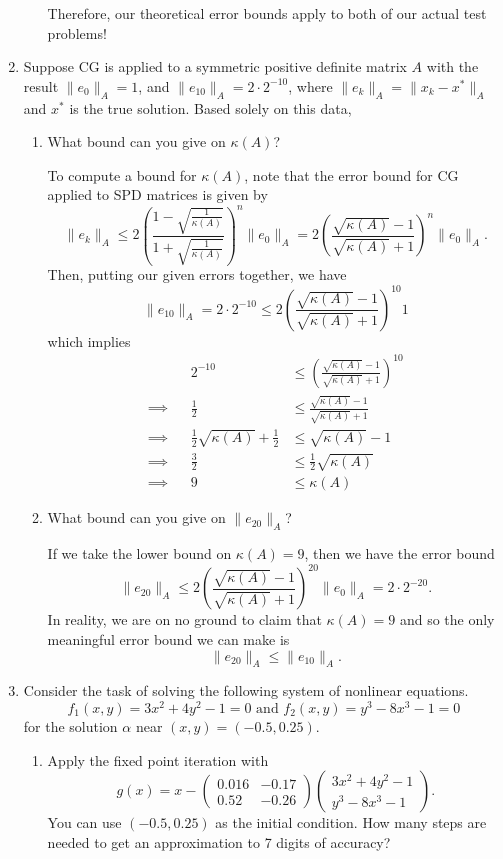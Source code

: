 \documentclass[a4paper,12pt]{article}
\newcommand{\norm}[1]{\lVert #1 \rVert}
\newcommand{\pmat}[1]{\begin{pmatrix} #1 \end{pmatrix}}
\begin{document}
\begin{enumerate}[label = \arabic*)]
\begin{enumerate}[label = (\alph*)]
		Therefore, our theoretical error bounds apply to both of our actual test problems!
	\end{enumerate}

	\item Suppose CG is applied to a symmetric positive definite matrix $ A $ with the result $ \norm{e_0}_A = 1 $, and $ \norm{e_{10}}_A = 2 \cdot 2^{-10} $, where $ \norm{e_k}_A = \norm{x_k - x^*}_A $ and $ x^* $ is the true solution. Based solely on this data,
	\begin{enumerate}[label = (\alph*)]
		\item What bound can you give on $ \kappa(A) $?
		
		To compute a bound for $ \kappa(A) $, note that the error bound for CG applied to SPD matrices is given by
		\[
			\norm{e_k}_A \leq 2 \left(\frac{1 - \sqrt{\frac{1}{\kappa(A)}}}{1 + \sqrt{\frac{1}{\kappa(A)}}}\right)^n \norm{e_0}_A = 2 \left(\frac{\sqrt{\kappa(A)} - 1}{\sqrt{\kappa(A)} + 1}\right)^n \norm{e_0}_A.
		\]
		Then, putting our given errors together, we have
		\[
			\norm{e_{10}}_A = 2 \cdot 2^{-10} \leq 2 \left(\frac{\sqrt{\kappa(A)} - 1}{\sqrt{\kappa(A)} + 1}\right)^{10} 1
		\]
		which implies
		\begin{align*}
			&&2^{-10} &\leq \left(\frac{\sqrt{\kappa(A)} - 1}{\sqrt{\kappa(A)} + 1}\right)^{10} \\
			\implies && \frac{1}{2} &\leq \frac{\sqrt{\kappa(A)} - 1}{\sqrt{\kappa(A)} + 1} \\
			\implies && \frac{1}{2}\sqrt{\kappa(A)} + \frac{1}{2} & \leq \sqrt{\kappa(A)} - 1 \\
			\implies && \frac{3}{2} &\leq \frac{1}{2}\sqrt{\kappa(A)} \\
			\implies &&  9 &\leq \kappa(A)
		\end{align*}
	
		\item What bound can you give on $ \norm{e_{20}}_A $?
		
		If we take the lower bound on $ \kappa(A) = 9 $, then we have the error bound
		\[
			\norm{e_{20}}_A \leq 2 \left(\frac{\sqrt{\kappa(A)} - 1}{\sqrt{\kappa(A)} + 1}\right)^{20} \norm{e_0}_A = 2 \cdot 2^{-20}.
		\]
		In reality, we are on no ground to claim that $ \kappa(A) = 9 $ and so the only meaningful error bound we can make is 
		\[
			\norm{e_{20}}_A \leq \norm{e_{10}}_A.
		\]
	\end{enumerate}

	\item Consider the task of solving the following system of nonlinear equations.
	\[
		f_1(x,y) = 3x^2 + 4y^2 - 1 = 0 \text{ and } f_2(x,y) = y^3 - 8x^3 - 1 = 0
	\]
	for the solution $ \alpha $ near $ (x,y) = (-0.5, 0.25) $.
	\begin{enumerate}[label = (\alph*)]
		\item Apply the fixed point iteration with
		\[
			g(x) = x - \pmat{0.016 & -0.17 \\ 0.52 & -0.26} \pmat{3x^2 + 4y^2 - 1 \\ y^3 - 8x^3 - 1}.
		\]
		You can use $ (-0.5, 0.25) $ as the initial condition. How many steps are needed to get an approximation to 7 digits of accuracy?
		

\end{enumerate}
\end{enumerate}
\end{document}

